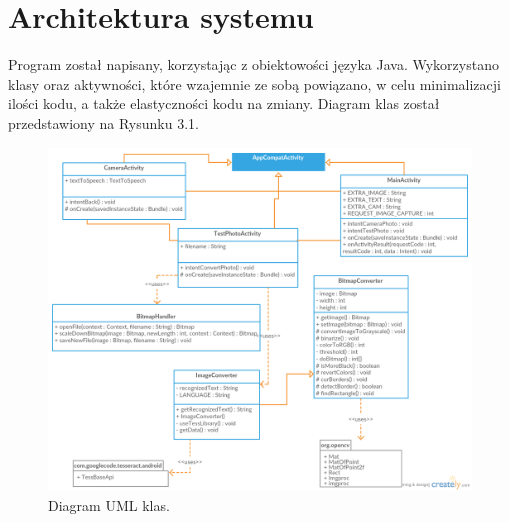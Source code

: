 \documentclass[eng,oneside]{mgr}
\begin{document}
\chapter{Architektura systemu}
Program został napisany, korzystając z obiektowości języka Java. Wykorzystano klasy oraz aktywności, które wzajemnie ze sobą powiązano, w celu minimalizacji ilości kodu, a także elastyczności kodu na zmiany. Diagram klas został przedstawiony na Rysunku 3.1. \\
\begin{figure}[htbp]
\centering
\includegraphics[scale=0.5]{diagramuml.png}
\caption{Diagram UML klas.}
\end{figure}
\end{document}
